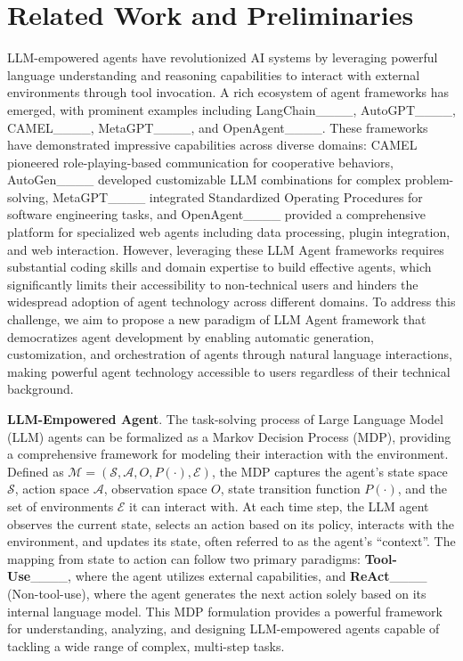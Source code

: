 \section{Related Work and Preliminaries}
\label{sec:preliminary}

LLM-empowered agents have revolutionized AI systems by leveraging powerful language understanding and reasoning capabilities to interact with external environments through tool invocation. A rich ecosystem of agent frameworks has emerged, with prominent examples including LangChain____, AutoGPT____, CAMEL____, MetaGPT____, and OpenAgent____. These frameworks have demonstrated impressive capabilities across diverse domains: CAMEL pioneered role-playing-based communication for cooperative behaviors, AutoGen____ developed customizable LLM combinations for complex problem-solving, MetaGPT____ integrated Standardized Operating Procedures for software engineering tasks, and OpenAgent____ provided a comprehensive platform for specialized web agents including data processing, plugin integration, and web interaction. However, leveraging these LLM Agent frameworks requires substantial coding skills and domain expertise to build effective agents, which significantly limits their accessibility to non-technical users and hinders the widespread adoption of agent technology across different domains. To address this challenge, we aim to propose a new paradigm of LLM Agent framework that democratizes agent development by enabling automatic generation, customization, and orchestration of agents through natural language interactions, making powerful agent technology accessible to users regardless of their technical background.

\noindent \textbf{LLM-Empowered Agent}. The task-solving process of Large Language Model (LLM) agents can be formalized as a Markov Decision Process (MDP), providing a comprehensive framework for modeling their interaction with the environment. Defined as $\mathcal{M} = (\mathcal{S}, \mathcal{A}, O, P(\cdot), \mathcal{E})$, the MDP captures the agent's state space $\mathcal{S}$, action space $\mathcal{A}$, observation space $O$, state transition function $P(\cdot)$, and the set of environments $\mathcal{E}$ it can interact with. At each time step, the LLM agent observes the current state, selects an action based on its policy, interacts with the environment, and updates its state, often referred to as the agent's ``context''. The mapping from state to action can follow two primary paradigms: \textbf{Tool-Use}____, where the agent utilizes external capabilities, and \textbf{ReAct}____ (Non-tool-use), where the agent generates the next action solely based on its internal language model. This MDP formulation provides a powerful framework for understanding, analyzing, and designing LLM-empowered agents capable of tackling a wide range of complex, multi-step tasks.

